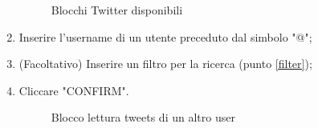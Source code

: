 \begin{enumerate}
\begin{figure}[!ht]
		\caption{Blocchi Twitter disponibili}
	\end{figure}
	\newpage
	\item Inserire l'username di un utente preceduto dal simbolo "@";
	\item (Facoltativo) Inserire un filtro per la ricerca (punto \ref{filter});
	\item Cliccare "CONFIRM".
	\begin{figure}[!ht]
		\centering
		\caption{Blocco lettura tweets di un altro user}
	\end{figure}
\end{enumerate}
